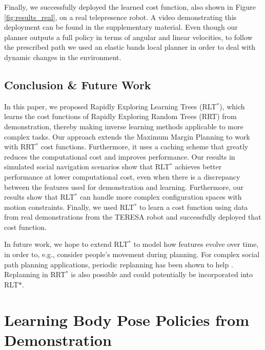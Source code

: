 \documentclass[a4paper,11pt]{report}
\begin{document}
	Finally, we successfully deployed the learned cost function, also shown in Figure \ref{fig:results_real}, on a real telepresence robot. A video demonstrating this deployment can be found in the supplementary material. Even though our planner outputs a full policy in terms of angular and linear velocities, to follow the prescribed path we used an elastic bands local planner in order to deal with dynamic changes in the environment.



\vspace{-1mm}
\subsection{Conclusion \& Future Work}
In this paper, we proposed Rapidly Exploring Learning Trees (RLT$^*$), which learns the cost functions of Rapidly Exploring Random Trees (RRT) from demonstration, thereby making inverse learning methods applicable to more complex tasks. Our approach extends the Maximum Margin Planning to work with RRT$^*$ cost functions. Furthermore, it uses a caching scheme that greatly reduces the computational cost and improves performance. Our results in simulated social navigation scenarios show that RLT$^*$ achieves better performance at lower computational cost, even when there is a discrepancy between the features used for demonstration and learning. Furthermore, our results show that RLT$^*$ can handle more complex configuration spaces with motion constraints. Finally, we used RLT$^*$ to learn a cost function using data from real demonstrations from the TERESA robot and successfully deployed that cost function.

In future work, we hope to extend RLT$^*$ to model how features evolve over time, in order to, e.g., consider people's movement during planning.  For complex social path planning applications, periodic replanning has been shown to help \cite{henry2010learning,vasquez2014inverse}. Replanning in RRT$^*$ is also possible \cite{otte2015rrtx} and could potentially be incorporated into RLT$*$.


\clearpage





\section{Learning Body Pose Policies from Demonstration}
\label{sec:sl_policy}
\end{document}
